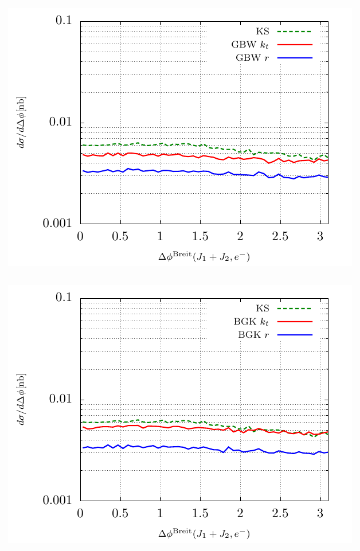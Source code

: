 \documentclass[a4,12pt]{article}
\begin{document}
\begin{figure}[p]
	\begin{subfigure}{0.5\textwidth}
	\includegraphics[width=\textwidth]{gnuplot/plotGBW1} 
	\end{subfigure}
	\begin{subfigure}{0.5\textwidth}
	\includegraphics[width=\textwidth]{gnuplot/plotBGK1} 
	\end{subfigure}
	\begin{subfigure}{0.5\textwidth}

\end{subfigure}
\end{figure}
\end{document}
